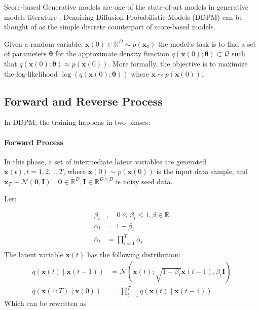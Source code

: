 \documentclass[11pt]{article}
\begin{document}
    Score-based Generative models are one of the state-of-art models in generative models literature \cite{song2020generative,song2021scorebased}.
    Denoising Diffusion Probabilistic Models (DDPM) can be thought of as the simple discrete counterpart of score-based models.


    Given a random variable,  $\mathbf{x}(0) \in \mathbb{R}^{D} \sim p(\mathbf{x}_0)$ the model's task is to find a set
    of parameters $\bm{\theta}$ for the approximate density function $q(\mathbf{x}(0);\bm{\theta}) \subset \mathcal{Q}$ such
    that $q(\mathbf{x}(0);\bm{\theta}) \approx p(\mathbf{x}(0))$.
    More formally, the objective is to maximize the log-likelihood $ \log(q(\mathbf{x}(0);\bm{\theta}))$
    where $\boldsymbol{x} \sim p(\mathbf{x}(0))$.

    \subsection{Forward and Reverse Process}\label{subsec:forward-and-reverse-process}
    In DDPM, the training happens in two phases:

    \paragraph{Forward Process}
    In this phase, a set of intermediate latent variables are generated $\mathbf{x}(t), t={1,2,..,T}$, where
    $\mathbf{x}(0) \sim p(\mathbf{x}(0))$ is the input data sample, and $\mathbf{x}_T \sim \mathcal{N}(\mathbf{0},\mathbf{I})
    \quad \mathbf{0} \in \mathbb{R}^{D}, \mathbf{I} \in \mathbb{R}^{D \times D}$ is noisy seed data.\par


    Let:

    \begin{equation}
        \begin{aligned}
            \beta_t &, \quad 0 \leq \beta_t \leq 1,\beta \in \mathbb{R} \\
            \alpha_t &= 1-\beta_t \\
            \bar{\alpha}_t &= \prod_{i=1}^{T} \alpha_i \\
        \end{aligned}
        \label{eq:ddpm-constants}
    \end{equation}
    The latent variable $\mathbf{x}(t)$ has the following distribution:
    \begin{equation}
        \label{eq:ddpm-xt-given-xt-minus-1}
        \begin{aligned}
            q\left(\mathbf{x}(t) \mid \mathbf{x}(t-1)\right) &=\mathcal{N}\left(\mathbf{x}(t) ;
            \sqrt{1-\beta_t} \mathbf{x}(t-1), \beta_t \mathbf{I}\right) \\
            q\left(\mathbf{x}(1: T) \mid \mathbf{x}(0)\right) &=\prod_{t=1}^T q\left(\mathbf{x}(t) \mid \mathbf{x}(t-1)\right)
        \end{aligned}
    \end{equation}
    Which can be rewritten as
\end{document}
